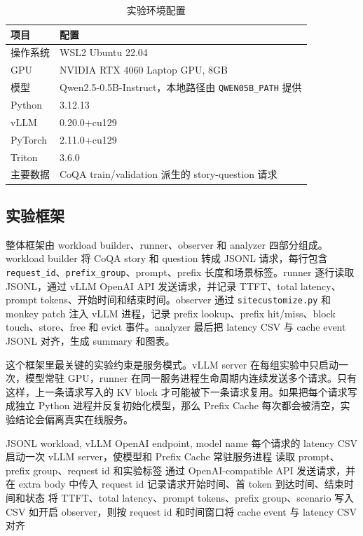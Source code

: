 \documentclass[UTF8,a4paper,10pt]{ctexart}
\begin{document}
\begin{table}[H]
\centering
\small
\caption{实验环境配置}
\label{tab:env}
\begin{tabular}{ll}
\toprule
项目 & 配置 \\
\midrule
操作系统 & WSL2 Ubuntu 22.04 \\
GPU & NVIDIA RTX 4060 Laptop GPU, 8GB \\
模型 & Qwen2.5-0.5B-Instruct，本地路径由 \texttt{QWEN05B\_PATH} 提供 \\
Python & 3.12.13 \\
vLLM & 0.20.0+cu129 \\
PyTorch & 2.11.0+cu129 \\
Triton & 3.6.0 \\
主要数据 & CoQA train/validation 派生的 story-question 请求 \\
\bottomrule
\end{tabular}
\end{table}

\subsection{实验框架}

整体框架由 workload builder、runner、observer 和 analyzer 四部分组成。workload builder 将 CoQA story 和 question 转成 JSONL 请求，每行包含 \texttt{request\_id}、\texttt{prefix\_group}、prompt、prefix 长度和场景标签。runner 逐行读取 JSONL，通过 vLLM OpenAI API 发送请求，并记录 TTFT、total latency、prompt tokens、开始时间和结束时间。observer 通过 \texttt{sitecustomize.py} 和 monkey patch 注入 vLLM 进程，记录 prefix lookup、prefix hit/miss、block touch、store、free 和 evict 事件。analyzer 最后把 latency CSV 与 cache event JSONL 对齐，生成 summary 和图表。

这个框架里最关键的实验约束是服务模式。vLLM server 在每组实验中只启动一次，模型常驻 GPU，runner 在同一服务进程生命周期内连续发送多个请求。只有这样，上一条请求写入的 KV block 才可能被下一条请求复用。如果把每个请求写成独立 Python 进程并反复初始化模型，那么 Prefix Cache 每次都会被清空，实验结论会偏离真实在线服务。

\begin{algorithm}[H]
\caption{服务模式下的 Prefix Cache 实验 runner}
\label{alg:runner}
\begin{algorithmic}[1]
\Require JSONL workload, vLLM OpenAI endpoint, model name
\Ensure 每个请求的 latency CSV
\State 启动一次 vLLM server，使模型和 Prefix Cache 常驻服务进程
    \State 读取 prompt、prefix group、request id 和实验标签
    \State 通过 OpenAI-compatible API 发送请求，并在 extra body 中传入 request id
    \State 记录请求开始时间、首 token 到达时间、结束时间和状态
    \State 将 TTFT、total latency、prompt tokens、prefix group、scenario 写入 CSV
\EndFor
\State 如开启 observer，则按 request id 和时间窗口将 cache event 与 latency CSV 对齐
\end{algorithmic}
\end{algorithm}
\end{document}
